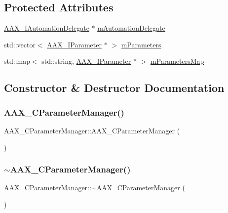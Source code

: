 \subsection*{Protected Attributes}
\begin{DoxyCompactItemize}
\item 
\mbox{\hyperlink{a01773}{A\+A\+X\+\_\+\+I\+Automation\+Delegate}} $\ast$ \mbox{\hyperlink{a01545_a3c8bc6b5a9210cb9703798dd644a3d70}{m\+Automation\+Delegate}}
\item 
std\+::vector$<$ \mbox{\hyperlink{a01857}{A\+A\+X\+\_\+\+I\+Parameter}} $\ast$ $>$ \mbox{\hyperlink{a01545_a59ea172cb668a4aaa990a66e2f67b0bb}{m\+Parameters}}
\item 
std\+::map$<$ std\+::string, \mbox{\hyperlink{a01857}{A\+A\+X\+\_\+\+I\+Parameter}} $\ast$ $>$ \mbox{\hyperlink{a01545_a172b774237eadfd83d1ffa6b3d80bf09}{m\+Parameters\+Map}}
\end{DoxyCompactItemize}


\subsection{Constructor \& Destructor Documentation}
\mbox{\label{a01545_a2464652c52cc61b437339a5268ee4f66}} 
\subsubsection{\texorpdfstring{AAX\_CParameterManager()}{AAX\_CParameterManager()}}
{\footnotesize\ttfamily A\+A\+X\+\_\+\+C\+Parameter\+Manager\+::\+A\+A\+X\+\_\+\+C\+Parameter\+Manager (\begin{DoxyParamCaption}{ }\end{DoxyParamCaption})}

\mbox{\label{a01545_a86e327094928b44b1ca11ef145d4f301}} 
\subsubsection{\texorpdfstring{$\sim$AAX\_CParameterManager()}{~AAX\_CParameterManager()}}
{\footnotesize\ttfamily A\+A\+X\+\_\+\+C\+Parameter\+Manager\+::$\sim$\+A\+A\+X\+\_\+\+C\+Parameter\+Manager (\begin{DoxyParamCaption}{ }\end{DoxyParamCaption})}



